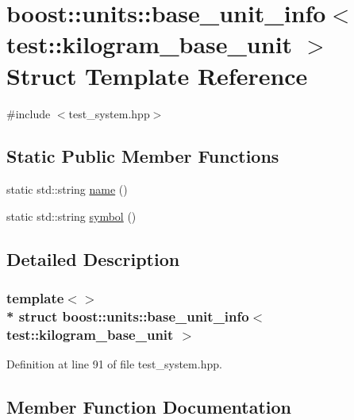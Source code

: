 \hypertarget{structboost_1_1units_1_1base__unit__info_3_01test_1_1kilogram__base__unit_01_4}{}\section{boost\+:\+:units\+:\+:base\+\_\+unit\+\_\+info$<$ test\+:\+:kilogram\+\_\+base\+\_\+unit $>$ Struct Template Reference}
\label{structboost_1_1units_1_1base__unit__info_3_01test_1_1kilogram__base__unit_01_4}


{\ttfamily \#include $<$test\+\_\+system.\+hpp$>$}

\subsection*{Static Public Member Functions}
\begin{DoxyCompactItemize}
\item 
static std\+::string \hyperlink{structboost_1_1units_1_1base__unit__info_3_01test_1_1kilogram__base__unit_01_4_a27d3dec6d0ef5b13390f5be8ec842296}{name} ()
\item 
static std\+::string \hyperlink{structboost_1_1units_1_1base__unit__info_3_01test_1_1kilogram__base__unit_01_4_a958d5121835061708a1d547687d70bc9}{symbol} ()
\end{DoxyCompactItemize}


\subsection{Detailed Description}
\subsubsection*{template$<$$>$\\*
struct boost\+::units\+::base\+\_\+unit\+\_\+info$<$ test\+::kilogram\+\_\+base\+\_\+unit $>$}



Definition at line 91 of file test\+\_\+system.\+hpp.



\subsection{Member Function Documentation}
